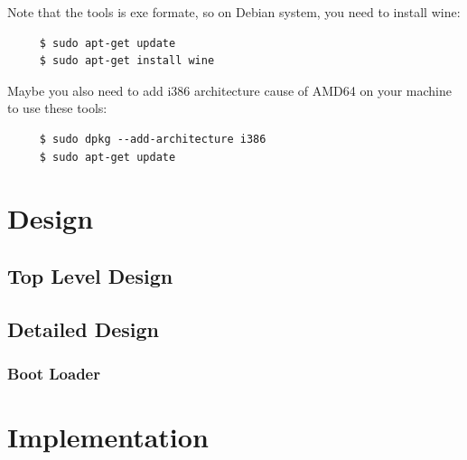 \documentclass{swfcthesisp}
\begin{document}
Note that the tools is exe formate, so on Debian system, you need to install wine:
\begin{lstlisting}
     $ sudo apt-get update
     $ sudo apt-get install wine
\end{lstlisting}

Maybe you also need to add i386 architecture cause of AMD64 on your machine to use \hspace*{0.8cm}these tools:
\begin{lstlisting}
     $ sudo dpkg --add-architecture i386
     $ sudo apt-get update
\end{lstlisting}

\chapter{Design}

\section{Top Level Design}
\label{sec:top-level-design}

\section{Detailed Design}
\label{sec:detailed-design}

\subsection{Boot Loader}
\label{sec:boot-loader}

\chapter{Implementation}
\end{document}
